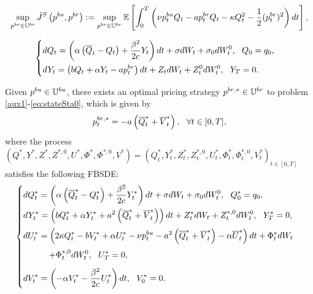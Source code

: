 \documentclass[10pt,a4paper]{amsart}
\begin{document}
\begin{align}\label{aux1}
\sup_{p^{{\rm br}}\in\mathbb{U}^{\rm br}}\tilde{J}^S\left(p^{{\rm bu}}, p^{{\rm br}}\right):=\sup_{p^{{\rm br}}\in\mathbb{U}^{\rm br}}\mathbb{E}\left[\int_0^T\left(\nu p_t^{{\rm bu}} Q_t-ap_t^{{\rm br}}Q_t-\kappa Q_t^2-\frac{1}{2}(p_t^{{\rm br}})^2\right)dt\right],
\end{align}

\begin{align}\label{eq:stateSta0}
\begin{cases}
    \displaystyle dQ_t=\left(\alpha\left(\overline{Q}_t-Q_t\right)+\frac{\beta^2}{2c}Y_t\right)dt+\sigma dW_t+\sigma_0dW_t^0,~~Q_0=q_0,\\[0.8em]
    \displaystyle dY_t=\left(bQ_t+\alpha Y_t- ap_t^{{\rm br}}\right)dt+Z_tdW_t+Z_t^0dW_t^0,~~Y_T=0.
\end{cases}
\end{align}

\begin{lemma}\label{pbr}
Given $p^{{\rm bu}}\in\mathbb{U}^{\rm bu}$, there exists an optimal pricing strategy $p^{{\rm br},*}\in\mathbb{U}^{\rm br}$ to problem \eqref{aux1}-\eqref{eq:stateSta0}, which is given by
\begin{align}\label{asymptotic1}
    p_t^{{\rm br},*}=-a\left(\overline{Q}_t^*+\overline{V}_t^*\right),~~ \forall t\in [0, T], 
\end{align}
where the process $(Q^*,Y^*,Z^*,Z^{*,0},U^*,\Phi^*,\Phi^{*,0},V^*)=(Q_t^*,Y_t^*,Z_t^*,Z_t^{*,0},U_t^*,\Phi_t^*,\Phi_t^{*,0},V_t^*)_{t\in[0,T]}$ satisfies the following FBSDE:
\begin{align}\label{fbsde4.2}
\begin{cases}
\displaystyle dQ_t^*=\left(\alpha\left(\overline{Q}_t^*-Q_t^*\right)+\frac{\beta^2}{2c}Y_t^*\right)dt+\sigma dW_t+\sigma_0dW_t^0,~~Q_0^*=q_0,\\[0.8em]
\displaystyle dY_t^*=\left(bQ_t^*+\alpha Y_t^*+a^2\left(\overline{Q}_t^*+\overline{V}_t^*\right)\right)dt+Z_t^*dW_t+Z_t^{*,0}dW_t^0,~~Y_T^*=0,\\[0.8em]
\displaystyle dU_t^*=\left(2\kappa Q_t^*-bV_t^*+\alpha U_t^*-\nu p_t^{{\rm bu}}-a^2\left(\overline{Q}_t^*+\overline{V}_t^*\right)-\alpha \overline{U}_t^*\right)dt+\Phi_t^* dW_t\\[0.8em]
\displaystyle\qquad\quad+\Phi_t^{*, 0}dW_t^0,~~U_T^*=0,\\[0.8em]
\displaystyle dV_t^*=\left(-\alpha V_t^*-\frac{\beta^2}{2c}U_t^*\right)dt,~~V_0^*=0.
\end{cases}
\end{align}
\end{lemma}
\end{document}

